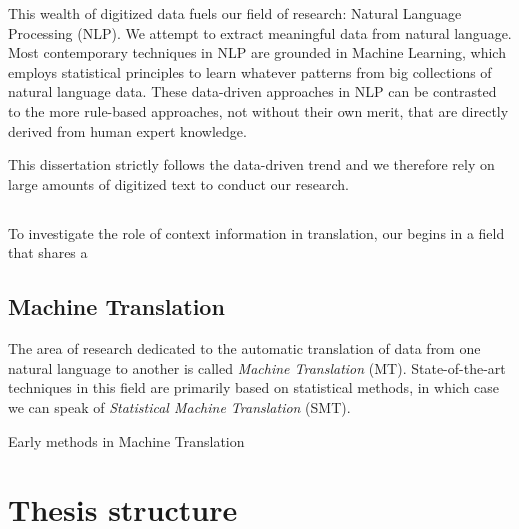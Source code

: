 This wealth of digitized data fuels our field of research: Natural Language
Processing (NLP). We attempt to extract meaningful data from natural language.
Most contemporary techniques in NLP are grounded in Machine Learning, which
employs statistical principles to learn whatever patterns from big collections
of natural language data. These data-driven approaches in NLP can be contrasted to
the more rule-based approaches, not without their own merit, that are directly
derived from human expert knowledge.

This dissertation strictly follows the data-driven trend and we therefore rely
on large amounts of digitized text to conduct our research.



\subsection{}

To investigate the role of context information in translation, our
begins in a field that shares a 






\subsection{Machine Translation}

The area of research dedicated to the automatic translation of data from one
natural language to another is called \emph{Machine Translation} (MT).
State-of-the-art techniques in this field are primarily based on statistical
methods, in which case we can speak of \emph{Statistical Machine Translation}
(SMT). 

Early methods in Machine Translation 



\section{Thesis structure}























